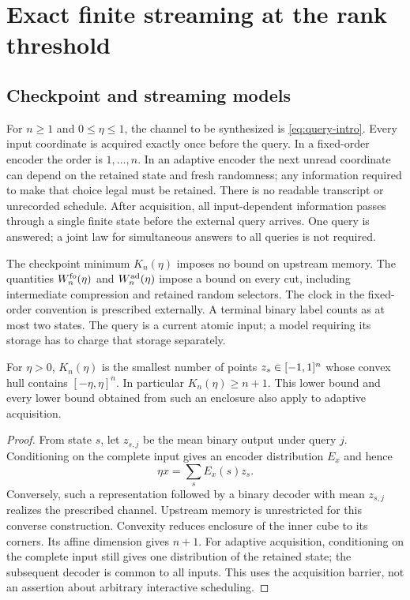 \section{Exact finite streaming at the rank threshold}
\label{sec:finite}
\subsection{Checkpoint and streaming models}
For $n\ge1$ and $0\le\eta\le1$, the channel to be synthesized is
\eqref{eq:query-intro}. Every input coordinate is acquired exactly once
before the query. In a fixed-order encoder the order is $1,\ldots,n$.
In an adaptive encoder the next unread coordinate can depend on the
retained state and fresh randomness; any information required to make
that choice legal must be retained. There is no readable transcript or
unrecorded schedule. After acquisition, all input-dependent information
passes through a single finite state before the external query arrives.
One query is answered; a joint law for simultaneous answers to all queries
is not required.

The checkpoint minimum $K_n(\eta)$ imposes no bound on upstream memory.
The quantities $W_n^{\rm fo}(\eta)$ and $W_n^{\rm ad}(\eta)$ impose a
bound on every cut, including intermediate compression and retained
random selectors. The clock in the fixed-order convention is prescribed
externally. A terminal binary label counts as at most two states. The
query is a current atomic input; a model requiring its storage has to
charge that storage separately.

\begin{lemma}\label{lem:cube}
For $\eta>0$, $K_n(\eta)$ is the smallest number of points
$z_s\in[-1,1]^n$ whose convex hull contains $[-\eta,\eta]^n$.
In particular $K_n(\eta)\ge n+1$. This lower bound and every lower
bound obtained from such an enclosure also apply to adaptive acquisition.
\end{lemma}
\begin{proof}
From state $s$, let $z_{s,j}$ be the mean binary output under query $j$.
Conditioning on the complete input gives an encoder distribution $E_x$
and hence
\begin{equation}\label{eq:query-factor}
                  \eta x=\sum_s E_x(s)z_s.
\end{equation}
Conversely, such a representation followed by a binary decoder with
mean $z_{s,j}$ realizes the prescribed channel. Upstream memory is
unrestricted for this converse construction. Convexity reduces enclosure
of the inner cube to its corners. Its affine dimension gives $n+1$.
For adaptive acquisition, conditioning on the complete input still gives
one distribution of the retained state; the subsequent decoder is common
to all inputs. This uses the acquisition barrier, not an assertion about
arbitrary interactive scheduling.
\end{proof}

